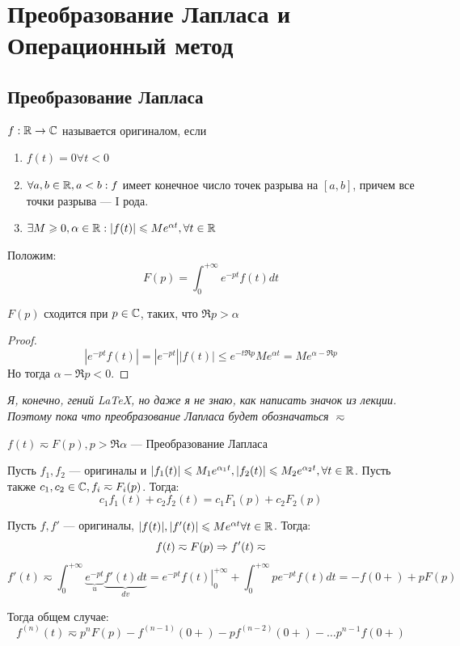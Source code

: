 

\section{Преобразование Лапласа и Операционный метод}
\subsection{Преобразование Лапласа}
\begin{definition}
    \(f: \mathbb{R} \rightarrow \mathbb{C}\) называется оригиналом, если 
    \begin{enumerate}
        \item \(f(t) = 0 \forall t < 0\)
        \item \(\forall a, b \in \mathbb{R}, a < b: f\) имеет конечное число точек разрыва на \([a, b]\), причем все точки разрыва --- I рода.
        \item \(\exists M \geqslant 0, \alpha \in \mathbb{R}: |f(t)| \leqslant Me^{\alpha t}, \forall t \in \mathbb{R}\)
    \end{enumerate}
\end{definition}

Положим:
\[F(p) = \int_0^{+\infty} e^{-pt}f(t)dt\]

\begin{lemma}
    \(F(p)\) сходится при \(p \in \mathbb{C}\), таких, что \(\Re p > \alpha\)
\end{lemma}
\begin{proof}
    \[|e^{-pt}f(t)| = |e^{-pt}||f(t)| \le e^{-t\Re p}Me^{\alpha t} = Me^{\alpha - \Re p}\]
    Но тогда \(\alpha - \Re p < 0\).
\end{proof}

\textit{Я, конечно, гений \LaTeX, но даже я не знаю, как написать значок из лекции. Поэтому пока что преобразование Лапласа будет обозначаться \(\eqsim\)}
\begin{definition}
    \(f(t) \eqsim F(p), p > \Re \alpha\) --- Преобразование Лапласа
\end{definition}

\begin{note}
    Пусть \(f_1, f_2\) --- оригиналы и \(|f_1(t)| \leqslant M_1e^{\alpha_1 t}, |f_2(t)| \leqslant M_2e^{\alpha_2 t}, \forall t \in \mathbb{R}\). Пусть также  \(c_1, c_2 \in \mathbb{C}, f_i \eqsim F_i(p)\). Тогда:
    \[c_1f_1(t) + c_2f_2(t) = c_1F_1(p) + c_2F_2(p)\]
\end{note}

\begin{note}
    Пусть \(f, f'\) --- оригиналы, \(|f(t)|, |f'(t)| \leqslant Me^{\alpha t} \forall t \in \mathbb{R}\). Тогда:
    \[f(t) \eqsim F(p) \Rightarrow f'(t) \eqsim \]
    \[f'(t) \eqsim \int_0^{+\infty}\underbrace{e^{-pt}}_{u}\underbrace{f'(t)dt}_{dv} = \left.e^{-pt}f(t)\right|_0^{+\infty} + \int_0^{+\infty}pe^{-pt}f(t)dt = -f(0+) + pF(p)\]

    Тогда общем случае:
    \[f^{(n)}(t) \eqsim p^nF(p) - f^{(n - 1)}(0 + ) - pf^{(n - 2)}(0 + ) - \dots p^{n - 1}f(0 +)\]
\end{note}

